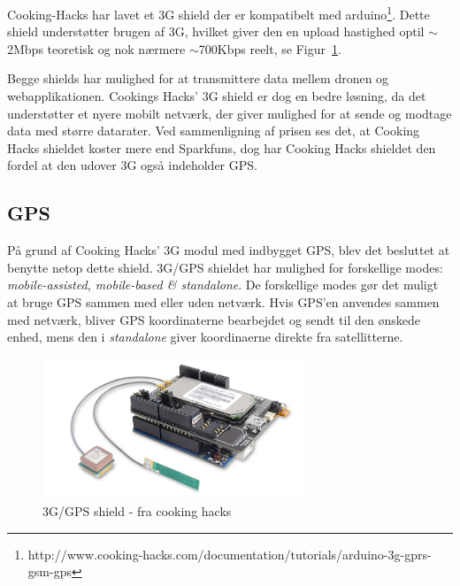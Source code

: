 Cooking-Hacks har lavet et 3G shield der er kompatibelt med arduino\footnote{http://www.cooking-hacks.com/documentation/tutorials/arduino-3g-gprs-gsm-gps}. Dette shield understøtter brugen af 3G, hvilket giver den en upload hastighed optil $\sim$2Mbps teoretisk og nok nærmere $\sim$700Kbps reelt, se Figur~\ref{fig:3gtable}.

Begge shields har mulighed for at transmittere data mellem dronen og webapplikationen. Cookings Hacks' 3G shield er dog en bedre løsning, da det understøtter et nyere mobilt netværk, der giver mulighed for at sende og modtage data med større datarater.
Ved sammenligning af prisen ses det, at Cooking Hacks shieldet koster mere end Sparkfuns, dog har Cooking Hacks shieldet den fordel at den udover 3G også indeholder GPS.

\subsection{GPS}
På grund af Cooking Hacks' 3G modul med indbygget GPS, blev det besluttet at benytte netop dette shield. 3G/GPS shieldet har mulighed for forskellige modes: \textit{mobile-assisted, mobile-based \& standalone}. De forskellige modes gør det muligt at bruge GPS sammen med eller uden netværk. \newline 
Hvis GPS'en anvendes sammen med netværk, bliver GPS koordinaterne bearbejdet og sendt til den ønskede enhed, mens den i \textit{standalone} giver koordinaerne direkte fra satellitterne.

\begin{figure}[H]
\centering
\includegraphics[width=0.7\textwidth]{Billeder/3G.png}
\caption{3G/GPS shield - fra cooking hacks}
\label{fig:3gtable}
\end{figure}
